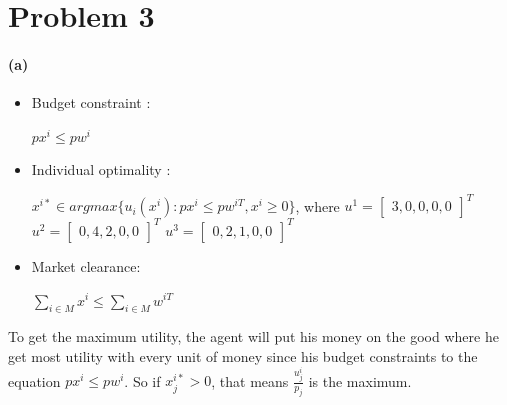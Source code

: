 \documentclass{article}
\newenvironment{answer}{\par\color{ForestGreen}}{\par}
\begin{document}
\section{Problem 3}
\begin{answer}
  \paragraph{(a)}
  \begin{itemize}
    \item Budget constraint :

    $px^i \leq pw^i $
    \item Individual optimality :

    $x^{i*} \in argmax \{u_i(x^i) : px^i \leq pw^{iT},x^i \geq 0 \}$,
    where
    $u^1 = \begin{bmatrix} 3, 0, 0, 0, 0 \end{bmatrix}^T$
    $u^2 = \begin{bmatrix} 0, 4, 2, 0, 0 \end{bmatrix}^T$
    $u^3 = \begin{bmatrix} 0, 2, 1, 0, 0 \end{bmatrix}^T$

    \item Market clearance:

    $\sum_{i\in M} x^i \leq \sum_{i\in M} w^{iT}$
  \end{itemize}

  To get the maximum utility, the agent will put his money on the good where he get most utility with every unit of money since his budget constraints to the equation $px^i \leq pw^i $. So if $x_j^{i*} >0$, that means $\frac{u_j^i}{p_j}$ is the maximum.


\end{answer}
\end{document}
